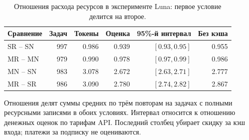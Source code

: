 \begin{table}[htbp]\centering\small
\caption{Отношения расхода ресурсов в эксперименте Luna: первое условие делится на второе.}
\label{tab:scale-resources}
\begin{tabular}{lrrrrr}\toprule
Сравнение & Задач & Токены & Оценка & 95\%-й интервал & Без кэша\\\midrule
SR -- SN & 997 & 0.986 & 0.939 & $[0.93, 0.95]$ & 0.955\\
MR -- MN & 979 & 0.990 & 0.978 & $[0.97, 0.99]$ & 0.986\\
MN -- SN & 983 & 3.078 & 2.672 & $[2.63, 2.71]$ & 2.777\\
MR -- SR & 986 & 3.090 & 2.780 & $[2.74, 2.82]$ & 2.867\\
\bottomrule\end{tabular}
\par\smallskip\noindent Отношения делят суммы средних по трём повторам на задачах с полными ресурсными записями в обоих условиях. Интервал относится к отношению денежных оценок по тарифам API. Последний столбец убирает скидку за кэш входа; платежи за подписку не оцениваются.
\end{table}
